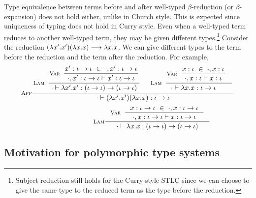 Type equivalence between terms before and after well-typed $\beta$-reduction
(or $\beta$-expansion) does not hold either, unlike in Church style.
This is expected since uniqueness of typing does not hold in Curry style.
Even when a well-typed term reduces to another well-typed term, they may be
given different types.\footnote{Subject reduction still holds for
the Curry-style STLC since we can choose to give the same type to
the reduced term as the type before the reduction.}
Consider the reduction $(\lambda x'.x')(\lambda x.x) --> \lambda x.x$.
We can give different types to the term before the reduction and the
term after the reduction. For example,
\[\setpremisesend{.1em} 
\inference[\sc App]
 {
   \inference[\sc Lam]
     { \inference[\sc Var]
         {x' : \iota -> \iota ~\in~ \cdot, x' : \iota -> \iota}
         {\cdot,x' : \iota -> \iota |- x': \iota -> \iota}
     }
     {\cdot |- \l x'.x' : (\iota -> \iota) -> (\iota -> \iota)}
 &
   \inference[\sc Lam]
     {\inference[\sc Var]{x:\iota ~\in~ \cdot,x:\iota}
                         {\cdot,x:\iota |- x:\iota} \phantom{x'}}
     {\cdot |- \l x.x : \iota -> \iota \phantom{(x')}}
 }
 {\cdot |- (\l x'.x')(\l x.x) : \iota -> \iota}
\]
\[\qquad\qquad\qquad\quad
\inference[\sc Lam]
  {\inference[\sc Var]{x:\iota->\iota ~\in~ \cdot,x:\iota->\iota}
                      {\cdot,x:\iota->\iota |- x:\iota->\iota} }
  {\cdot |- \l x.x : (\iota -> \iota) -> (\iota -> \iota)}
\]



\subsection{Motivation for polymorphic type systems}\label{sec:stlc:topoly}

